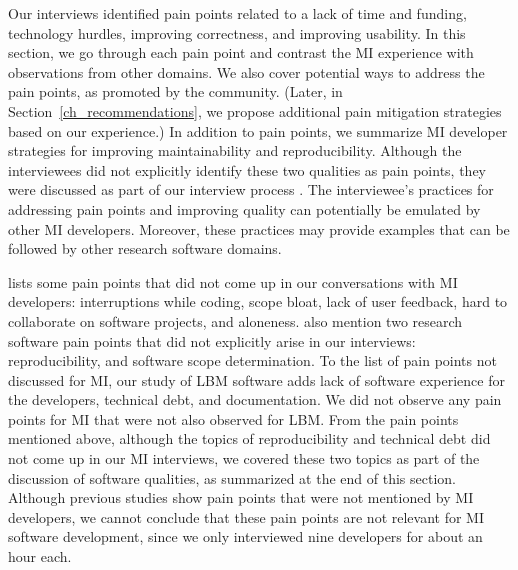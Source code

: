 \documentclass[final, 3p, times, authoryear]{elsarticle}
\begin{document}
Our interviews identified pain points related to a lack of time and funding,
technology hurdles, improving correctness, and improving usability.  In this
section, we go through each pain point and contrast the MI experience with
observations from other domains.  We also cover potential ways to address the
pain points, as promoted by the community.  (Later, in
Section~\ref{ch_recommendations}, we propose additional pain mitigation
strategies based on our experience.)  In addition to pain points, we summarize
MI developer strategies for improving maintainability and reproducibility.
Although the interviewees did not explicitly identify these two qualities as
pain points, they were discussed as part of our interview process
\citep{SmithEtAl2021}.  The interviewee's practices for addressing pain points
and improving quality can potentially be emulated by other MI developers.
Moreover, these practices may provide examples that can be followed by other
research software domains.

\citet{PintoEtAl2018} lists some pain points that did not come up in our
conversations with MI developers: interruptions while coding, scope bloat, lack
of user feedback, hard to collaborate on software projects, and aloneness.
\citet{WieseEtAl2019} also mention two research software pain points that did
not explicitly arise in our interviews: reproducibility, and software scope
determination.  To the list of pain points not discussed for MI, our study of
LBM software \citep{SmithEtAl2022} adds lack of software experience for the
developers, technical debt, and documentation. We did not observe any pain
points for MI that were not also observed for LBM. From the pain points
mentioned above, although the topics of reproducibility and technical debt did
not come up in our MI interviews, we covered these two topics as part of the
discussion of software qualities, as summarized at the end of this section.
Although previous studies show pain points that were not mentioned by MI
developers, we cannot conclude that these pain points are not relevant for MI
software development, since we only interviewed nine developers for about an
hour each.
\end{document}
